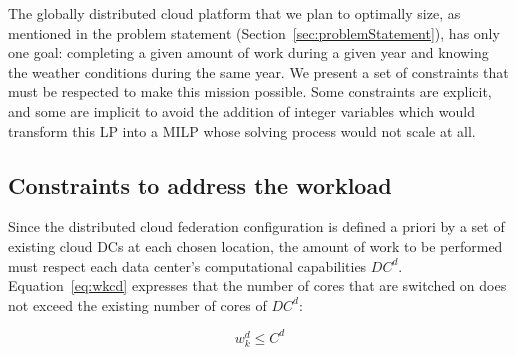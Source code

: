 
The globally distributed cloud platform that we plan to optimally size, as mentioned in the problem statement (Section~\ref{sec:problemStatement}), has only one goal: completing a given amount of work during a given year and knowing the weather conditions during the same year. We present a set of constraints that must be respected to make this mission possible. Some constraints are explicit, and some are implicit to avoid the addition of integer variables which would transform this LP into a MILP whose solving process would not scale at all.

\subsection{Constraints to address the workload}

Since the distributed cloud federation configuration is defined a priori by a set of existing cloud DCs at each chosen location, the amount of work to be performed must respect each data center's computational capabilities $DC^d$. Equation~\eqref{eq:wkcd} expresses that the number of cores that are switched on does not exceed the existing number of cores of $DC^d$:

\begin{equation}\label{eq:wkcd}
    w_k^d \leq C^d
\end{equation}





